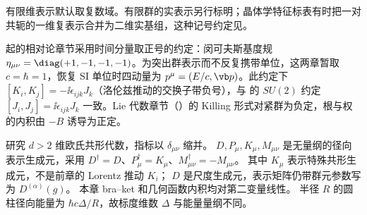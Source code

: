 有限维表示默认取复数域。有限群的实表示另行标明；晶体学特征标表有时把一对共轭的一维复表示合并为二维实基组，这种记号约定见。

 起的相对论章节采用时间分量取正号的约定：闵可夫斯基度规 $\eta_{\mu\nu}=\diag(+1,-1,-1,-1)$。为突出群表示而不反复携带单位，这两章暂取 $c=\hbar=1$，恢复 SI 单位时四动量为 $p^\mu=(E/c,\vb p)$。此约定下 $[K_i,K_j]=-\ii\epsilon_{ijk}J_k$（洛伦兹推动的交换子带负号），与  的 $SU(2)$ 约定 $[J_i,J_j]=\ii\epsilon_{ijk}J_k$ 一致。Lie 代数章节（）的 Killing 形式对紧群为负定，根与权的内积由 $-B$ 诱导为正定。


研究 $d>2$ 维欧氏共形代数，指标以 $\delta_{\mu\nu}$ 缩并。
$D,P_\mu,K_\mu,M_{\mu\nu}$ 是无量纲的径向表示生成元，采用
$D^\dagger=D$、$P_\mu^\dagger=K_\mu$、$M_{\mu\nu}^\dagger=-M_{\mu\nu}$。
其中 $K_\mu$ 表示特殊共形生成元，不是前章的 Lorentz 推动 $K_i$；
$D$ 是尺度生成元，表示矩阵仍带群元参数写为 $D^{(\alpha)}(g)$。
本章 bra--ket 和几何函数内积均对第二变量线性。
半径 $R$ 的圆柱径向能量为 $\hbar c\Delta/R$，故标度维数 $\Delta$ 与能量量纲不同。
